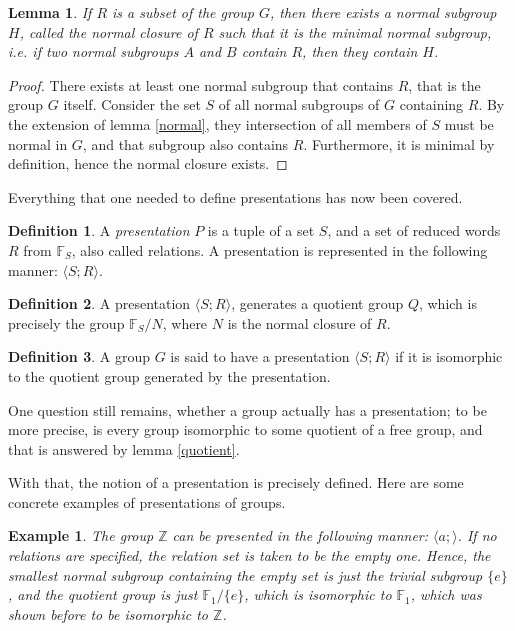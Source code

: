 \documentclass[12pt, titlepage]{article}
\newtheorem{lem}[thm]{Lemma}
\newtheorem{exmp}[thm]{Example}
\theoremstyle{definition}
\newtheorem{defn}{Definition}[section]
\begin{document}
\begin{lem}\cite{meier}
If $R$ is a subset of the group $G$, then there exists a normal subgroup $H$, called the normal closure of $R$ such that it is the \emph{minimal} normal subgroup, i.e. if two normal subgroups $A$ and $B$ contain $R$, then they contain $H$.
\end{lem}

\begin{proof}
There exists at least one normal subgroup that contains $R$, that is the group $G$ itself. Consider the set $S$ of all normal subgroups of $G$ containing $R$. By the extension of lemma \autoref{normal}, they intersection of all members of $S$ must be normal in $G$, and that subgroup also contains $R$. Furthermore, it is minimal by definition, hence the normal closure exists.
\end{proof}

Everything that one needed to define presentations has now been covered.

\begin{defn}
A \emph{presentation} $P$ is a tuple of a set $S$, and a set of reduced words $R$ from $\mathbb{F}_S$, also called relations. A presentation is represented in the following manner: $\langle S;R\rangle$.
\end{defn}

\begin{defn}
A presentation $\langle S;R\rangle$, generates a quotient group $Q$, which is precisely the group $\mathbb{F}_S/N$, where $N$ is the normal closure of $R$.
\end{defn}

\begin{defn}
A group $G$ is said to have a presentation $\langle S;R \rangle$ if it is isomorphic to the quotient group generated by the presentation.
\end{defn}

One question still remains, whether a group actually has a presentation; to be more precise, is every group isomorphic to some quotient of a free group, and that is answered by lemma \autoref{quotient}. 

With that, the notion of a presentation is precisely defined. Here are some concrete examples of presentations of groups.

\begin{exmp}
The group $\mathbb{Z}$ can be presented in the following manner: $\langle a;\rangle$. If no relations are specified, the relation set is taken to be the empty one. Hence, the smallest normal subgroup containing the empty set is just the trivial subgroup $\{e\}$, and the quotient group is just $\mathbb{F}_1/\{e\}$, which is isomorphic to $\mathbb{F}_1$, which was shown before to be isomorphic to $\mathbb{Z}$.
\end{exmp}
\end{document}
